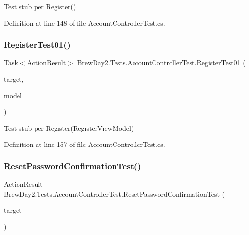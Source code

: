 Test stub per Register()



Definition at line 148 of file Account\+Controller\+Test.\+cs.

\mbox{\label{class_brew_day2_1_1_tests_1_1_account_controller_test_a1ee78b130805938d98a973e076803a55}} 
\subsubsection{\texorpdfstring{Register\+Test01()}{RegisterTest01()}}
{\footnotesize\ttfamily Task$<$Action\+Result$>$ Brew\+Day2.\+Tests.\+Account\+Controller\+Test.\+Register\+Test01 (\begin{DoxyParamCaption}\item[{\mbox{[}\+Pex\+Assume\+Under\+Test\mbox{]} \mbox{\hyperlink{class_brew_day2_1_1_controllers_1_1_account_controller}{Account\+Controller}}}]{target,  }\item[{\mbox{\hyperlink{class_brew_day2_1_1_models_1_1_register_view_model}{Register\+View\+Model}}}]{model }\end{DoxyParamCaption})}



Test stub per Register(\+Register\+View\+Model)



Definition at line 157 of file Account\+Controller\+Test.\+cs.

\mbox{\label{class_brew_day2_1_1_tests_1_1_account_controller_test_a7a031ab5085a878292c47235638abee4}} 
\subsubsection{\texorpdfstring{Reset\+Password\+Confirmation\+Test()}{ResetPasswordConfirmationTest()}}
{\footnotesize\ttfamily Action\+Result Brew\+Day2.\+Tests.\+Account\+Controller\+Test.\+Reset\+Password\+Confirmation\+Test (\begin{DoxyParamCaption}\item[{\mbox{[}\+Pex\+Assume\+Under\+Test\mbox{]} \mbox{\hyperlink{class_brew_day2_1_1_controllers_1_1_account_controller}{Account\+Controller}}}]{target }\end{DoxyParamCaption})}




